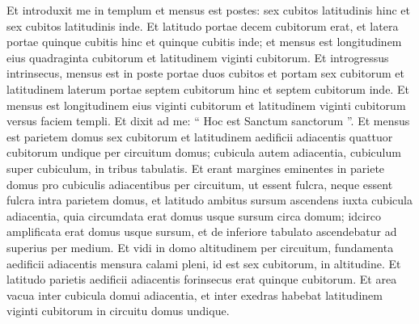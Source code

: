 \begin{biblechapter}
\begin{biblechapter}
\begin{biblechapter}
\begin{biblechapter}
\begin{biblechapter}
\begin{biblechapter}
\begin{biblechapter}
\begin{biblechapter}
\begin{biblechapter}
\begin{biblechapter}
\begin{biblechapter}
\begin{biblechapter}
\begin{biblechapter}
\begin{biblechapter}
\begin{biblechapter}
\begin{biblechapter}
\begin{biblechapter}
\begin{biblechapter}
\begin{biblechapter}
\begin{biblechapter}
\begin{biblechapter}
\begin{biblechapter}
\begin{biblechapter}
\begin{biblechapter}
\begin{biblechapter}
\begin{biblechapter}
\begin{biblechapter}
\begin{biblechapter}
\begin{biblechapter}
\begin{biblechapter}
\begin{biblechapter}
\begin{biblechapter}
\begin{biblechapter}
\begin{biblechapter}
\begin{biblechapter}
\begin{biblechapter}
\begin{biblechapter}
\begin{biblechapter}
\begin{biblechapter}
\begin{biblechapter}
\begin{biblechapter}
\verse Et introduxit me in templum et mensus est postes: sex cubitos latitudinis hinc et sex cubitos latitudinis inde. 
\verse Et latitudo portae decem cubitorum erat, et latera portae quinque cubitis hinc et quinque cubitis inde; et mensus est longitudinem eius quadraginta cubitorum et latitudinem viginti cubitorum.
 \verse Et introgressus intrinsecus, mensus est in poste portae duos cubitos et portam sex cubitorum et latitudinem laterum portae septem cubitorum hinc et septem cubitorum inde. 
\verse Et mensus est longitudinem eius viginti cubitorum et latitudinem viginti cubitorum versus faciem templi. Et dixit ad me: “ Hoc est Sanctum sanctorum ”.
 \verse Et mensus est parietem domus sex cubitorum et latitudinem aedificii adiacentis quattuor cubitorum undique per circuitum domus; 
\verse cubicula autem adiacentia, cubiculum super cubiculum, in tribus tabulatis. Et erant margines eminentes in pariete domus pro cubiculis adiacentibus per circuitum, ut essent fulcra, neque essent fulcra intra parietem domus, 
\verse et latitudo ambitus sursum ascendens iuxta cubicula adiacentia, quia circumdata erat domus usque sursum circa domum; idcirco amplificata erat domus usque sursum, et de inferiore tabulato ascendebatur ad superius per medium. 
\verse Et vidi in domo altitudinem per circuitum, fundamenta aedificii adiacentis mensura calami pleni, id est sex cubitorum, in altitudine. 
\verse Et latitudo parietis aedificii adiacentis forinsecus erat quinque cubitorum. Et area vacua inter cubicula domui adiacentia, 
\verse et inter exedras habebat latitudinem viginti cubitorum in circuitu domus undique. 

\end{biblechapter}
\end{biblechapter}
\end{biblechapter}
\end{biblechapter}
\end{biblechapter}
\end{biblechapter}
\end{biblechapter}
\end{biblechapter}
\end{biblechapter}
\end{biblechapter}
\end{biblechapter}
\end{biblechapter}
\end{biblechapter}
\end{biblechapter}
\end{biblechapter}
\end{biblechapter}
\end{biblechapter}
\end{biblechapter}
\end{biblechapter}
\end{biblechapter}
\end{biblechapter}
\end{biblechapter}
\end{biblechapter}
\end{biblechapter}
\end{biblechapter}
\end{biblechapter}
\end{biblechapter}
\end{biblechapter}
\end{biblechapter}
\end{biblechapter}
\end{biblechapter}
\end{biblechapter}
\end{biblechapter}
\end{biblechapter}
\end{biblechapter}
\end{biblechapter}
\end{biblechapter}
\end{biblechapter}
\end{biblechapter}
\end{biblechapter}
\end{biblechapter}
